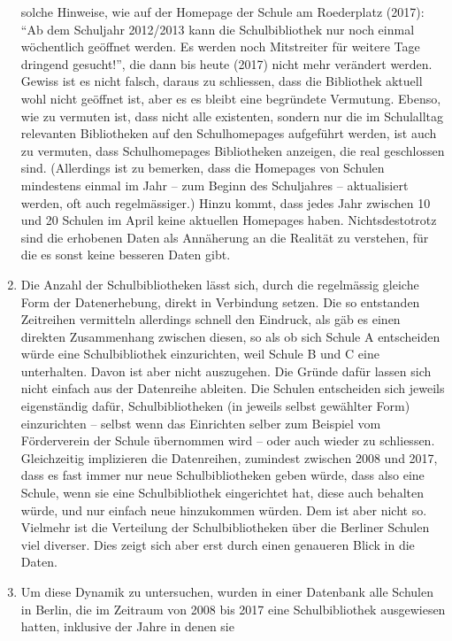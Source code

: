 \documentclass[a4paper,
fontsize=11pt,
oneside,
numbers=noperiodatend,
parskip=half-,
bibliography=totoc,
final
]{scrartcl}
\begin{document}
\begin{enumerate}
{    solche Hinweise, wie auf der Homepage der Schule am Roederplatz
    (2017): \enquote{Ab dem Schuljahr 2012/2013 kann die Schulbibliothek
    nur noch einmal wöchentlich geöffnet werden. Es werden noch
    Mitstreiter für weitere Tage dringend gesucht!}, die dann bis heute
    (2017) nicht mehr verändert werden. Gewiss ist es nicht falsch,
    daraus zu schliessen, dass die Bibliothek aktuell wohl nicht
    geöffnet ist, aber es es bleibt eine begründete Vermutung.} Ebenso,
  wie zu vermuten ist, dass nicht alle existenten, sondern nur die im
  Schulalltag relevanten Bibliotheken auf den Schulhomepages aufgeführt
  werden, ist auch zu vermuten, dass Schulhomepages Bibliotheken
  anzeigen, die real geschlossen sind. (Allerdings ist zu bemerken, dass
  die Homepages von Schulen mindestens einmal im Jahr -- zum Beginn des
  Schuljahres -- aktualisiert werden, oft auch regelmässiger.) Hinzu
  kommt, dass jedes Jahr zwischen 10 und 20 Schulen im April keine
  aktuellen Homepages haben. Nichtsdestotrotz sind die erhobenen Daten
  als Annäherung an die Realität zu verstehen, für die es sonst keine
  besseren Daten gibt.
\item
  Die Anzahl der Schulbibliotheken lässt sich, durch die regelmässig
  gleiche Form der Datenerhebung, direkt in Verbindung setzen. Die so
  entstanden Zeitreihen vermitteln allerdings schnell den Eindruck, als
  gäb es einen direkten Zusammenhang zwischen diesen, so als ob sich
  Schule A entscheiden würde eine Schulbibliothek einzurichten, weil
  Schule B und C eine unterhalten. Davon ist aber nicht auszugehen. Die
  Gründe dafür lassen sich nicht einfach aus der Datenreihe ableiten.
  Die Schulen entscheiden sich jeweils eigenständig dafür,
  Schulbibliotheken (in jeweils selbst gewählter Form) einzurichten --
  selbst wenn das Einrichten selber zum Beispiel vom Förderverein der
  Schule übernommen wird -- oder auch wieder zu schliessen. Gleichzeitig
  implizieren die Datenreihen, zumindest zwischen 2008 und 2017, dass es
  fast immer nur neue Schulbibliotheken geben würde, dass also eine
  Schule, wenn sie eine Schulbibliothek eingerichtet hat, diese auch
  behalten würde, und nur einfach neue hinzukommen würden. Dem ist aber
  nicht so. Vielmehr ist die Verteilung der Schulbibliotheken über die
  Berliner Schulen viel diverser. Dies zeigt sich aber erst durch einen
  genaueren Blick in die Daten.
\item
  Um diese Dynamik zu untersuchen, wurden in einer Datenbank alle
  Schulen in Berlin, die im Zeitraum von 2008 bis 2017 eine
  Schulbibliothek ausgewiesen hatten, inklusive der Jahre in denen sie

\end{enumerate}
\end{document}
